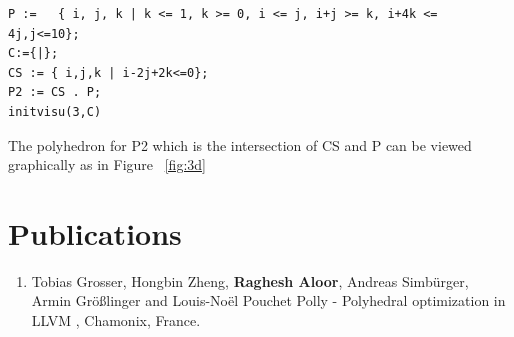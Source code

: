 \documentclass[MTech]{iitmdiss}
\begin{document}
{\footnotesize
\begin{lstlisting}
P :=   { i, j, k | k <= 1, k >= 0, i <= j, i+j >= k, i+4k <= 4j,j<=10};
C:={|};
CS := { i,j,k | i-2j+2k<=0};
P2 := CS . P;
initvisu(3,C)
\end{lstlisting}
}
The polyhedron for P2 which is the intersection of CS and P can be viewed graphically as in 
Figure ~\ref{fig:3d}




\chapter*{Publications}
\vspace{-0.3cm}

\begin{enumerate}
\item Tobias Grosser, Hongbin Zheng, \textbf{Raghesh Aloor}, Andreas Simb{\"u}rger, Armin {G}r{\"o}{\ss}linger and Louis-No{\"e}l Pouchet \newblock
  Polly - Polyhedral optimization in LLVM , Chamonix, France.
\end{enumerate}


\pagebreak
\begin{singlespace}
  \begin{small}
	
%
  \end{small}
\end{singlespace}

\end{document}
